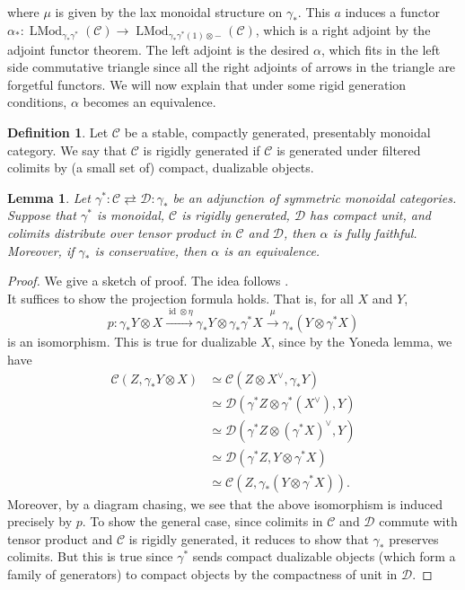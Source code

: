 \documentclass{article}
\newtheorem{lm}[thm]{Lemma}
\theoremstyle{definition}
\newtheorem{defn}[thm]{Definition}
\newcommand{\on}{\operatorname}
\begin{document}
where $\mu$ is given by the lax monoidal structure on $\gamma_\ast$. This $a$ induces a functor $\alpha_\ast: \on{LMod}_{\gamma_\ast\gamma^\ast}(\mathcal{C})\rightarrow\on{LMod}_{\gamma_\ast\gamma^\ast(1)\otimes-}(\mathcal{C})$, which is a right adjoint by the adjoint functor theorem. The left adjoint is the desired $\alpha$, which fits in the left side commutative triangle since all the right adjoints of arrows in the triangle are forgetful functors. We will now explain that under some rigid generation conditions, $\alpha$ becomes an equivalence.
\begin{defn}
Let $\mathcal{C}$ be a stable, compactly generated, presentably monoidal category. We say that $\mathcal{C}$ is rigidly generated if $\mathcal{C}$ is generated under filtered colimits by (a small set of) compact, dualizable objects.
\end{defn}
\begin{lm}\label{same.modules}
Let $\gamma^\ast: \mathcal{C} \rightleftarrows \mathcal{D}: \gamma_\ast$ be an adjunction of symmetric monoidal categories. Suppose that $\gamma^\ast$ is monoidal, $\mathcal{C}$ is rigidly generated, $\mathcal{D}$ has compact unit, and colimits distribute over tensor product in $\mathcal{C}$ and $\mathcal{D}$, then $\alpha$ is fully faithful. Moreover, if $\gamma_\ast$ is conservative, then $\alpha$ is an equivalence.
\end{lm}
\begin{proof}
We give a sketch of proof. The idea follows \cite[Appendix A]{BHS}.\\
It suffices to show the projection formula holds. That is, for all $X$ and $Y$,\[
p: \gamma_\ast Y\otimes X\xrightarrow{\on{id}\otimes\eta}\gamma_\ast Y\otimes\gamma_\ast\gamma^\ast X\xrightarrow{\mu}\gamma_\ast(Y\otimes\gamma^\ast X)
\]
is an isomorphism. This is true for dualizable $X$, since by the Yoneda lemma, we have\[
\begin{aligned}
\mathcal{C}(Z,\gamma_\ast Y\otimes X)&\simeq \mathcal{C}(Z\otimes X^\vee,\gamma_\ast Y)\\
&\simeq \mathcal{D}(\gamma^\ast Z\otimes\gamma^\ast (X^\vee), Y)\\
&\simeq \mathcal{D}(\gamma^\ast Z\otimes(\gamma^\ast X)^\vee, Y)\\
&\simeq \mathcal{D}(\gamma^\ast Z, Y\otimes\gamma^\ast X)\\
&\simeq \mathcal{C}(Z, \gamma_\ast(Y\otimes\gamma^\ast X)).
\end{aligned}\]
Moreover, by a diagram chasing, we see that the above isomorphism is induced precisely by $p$. To show the general case, since colimits in $\mathcal{C}$ and $\mathcal{D}$ commute with tensor product and $\mathcal{C}$ is rigidly generated, it reduces to show that $\gamma_\ast$ preserves colimits. But this is true since $\gamma^\ast$ sends compact dualizable objects (which form a family of generators) to compact objects by the compactness of unit in $\mathcal{D}$.
\end{proof}
\end{document}
